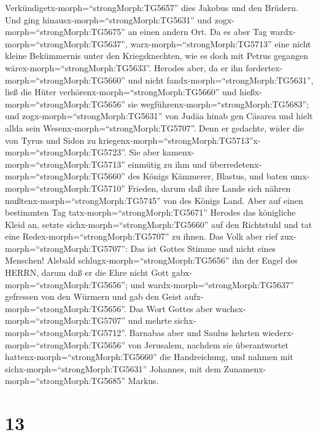 Verkündigetx-morph=``strongMorph:TG5657'' dies Jakobus und den Brüdern.
Und ging hinausx-morph=``strongMorph:TG5631'' und
zogx-morph=``strongMorph:TG5675'' an einen andern Ort.  Da
es aber Tag wardx-morph=``strongMorph:TG5637'',
warx-morph=``strongMorph:TG5713'' eine nicht kleine Bekümmernis unter
den Kriegsknechten, wie es doch mit Petrus gegangen
wärex-morph=``strongMorph:TG5633''.  Herodes aber, da er
ihn fordertex-morph=``strongMorph:TG5660'' und nicht
fandx-morph=``strongMorph:TG5631'', ließ die Hüter
verhörenx-morph=``strongMorph:TG5660'' und
hießx-morph=``strongMorph:TG5656'' sie
wegführenx-morph=``strongMorph:TG5683''; und
zogx-morph=``strongMorph:TG5631'' von Judäa hinab gen Cäsarea und hielt
allda sein Wesenx-morph=``strongMorph:TG5707''.  Denn er
gedachte, wider die von Tyrus und Sidon zu
kriegenx-morph=``strongMorph:TG5713''x-morph=``strongMorph:TG5723''. Sie
aber kamenx-morph=``strongMorph:TG5713'' einmütig zu ihm und
überredetenx-morph=``strongMorph:TG5660'' des Königs Kämmerer, Blastus,
und baten umx-morph=``strongMorph:TG5710'' Frieden, darum daß ihre Lande
sich nähren mußtenx-morph=``strongMorph:TG5745'' von des Königs Land.
 Aber auf einen bestimmten Tag
tatx-morph=``strongMorph:TG5671'' Herodes das königliche Kleid an,
setzte sichx-morph=``strongMorph:TG5660'' auf den Richtstuhl und tat
eine Redex-morph=``strongMorph:TG5707'' zu ihnen.  Das Volk
aber rief zux-morph=``strongMorph:TG5707'': Das ist Gottes Stimme und
nicht eines Menschen!  Alsbald
schlugx-morph=``strongMorph:TG5656'' ihn der Engel des HERRN, darum daß
er die Ehre nicht Gott gabx-morph=``strongMorph:TG5656''; und
wardx-morph=``strongMorph:TG5637'' gefressen von den Würmern und gab den
Geist aufx-morph=``strongMorph:TG5656''.  Das Wort Gottes
aber wuchsx-morph=``strongMorph:TG5707'' und mehrte
sichx-morph=``strongMorph:TG5712''.  Barnabas aber und
Saulus kehrten wiederx-morph=``strongMorph:TG5656'' von Jerusalem,
nachdem sie überantwortet hattenx-morph=``strongMorph:TG5660'' die
Handreichung, und nahmen mit sichx-morph=``strongMorph:TG5631''
Johannes, mit dem Zunamenx-morph=``strongMorph:TG5685'' Markus.

\hypertarget{section-12}{%
\section{13}\label{section-12}}

